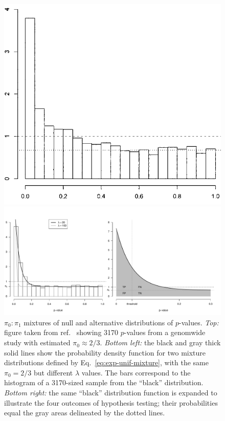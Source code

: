 \documentclass[letterpaper]{article}
\begin{document}
\begin{figure}[b]
\includegraphics[scale=1.04]{figures/storey-2003-fig1}

\includegraphics[scale=0.5]{figures/exp-unif-mixture-1.pdf}
\caption{\(\pi_0 : \pi_1\) mixtures of null and alternative distributions of
\(p\)-values.  \emph{Top:} figure taken from ref.~\cite{Storey:2003kx} showing
3170 \(p\)-values from a genomwide study with estimated \(\pi_0 \approx 2/3\).  \emph{Bottom left:} the black and gray thick solid lines show the probability density
function for two mixture distributions defined by
Eq.~\ref{eq:exp-unif-mixture}, with the same \(\pi_0=2/3\) but different \(\lambda\)
values.  The bars correspond to the histogram of a 3170-sized sample from the
``black'' distribution.  \emph{Bottom right:} the same ``black'' distribution
function is expanded to illustrate the four outcomes of hypothesis testing;
their probabilities equal the gray areas delineated by the dotted lines. }
\end{figure}
\end{document}

